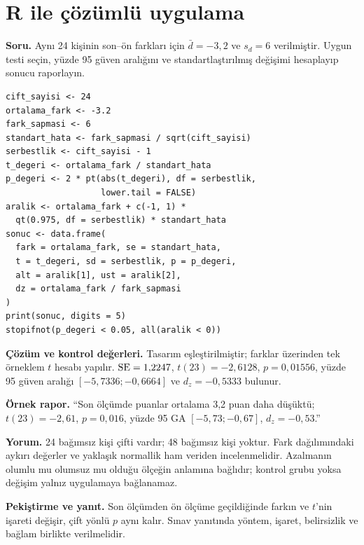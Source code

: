 \section{R ile çözümlü uygulama}
\label{sec:r-b14}

\textbf{Soru.} Aynı 24 kişinin son--ön farkları için $\bar d=-3{,}2$ ve
$s_d=6$ verilmiştir. Uygun testi seçin, yüzde 95 güven aralığını ve
standartlaştırılmış değişimi hesaplayıp sonucu raporlayın.

\begin{lstlisting}[style=prismR]
cift_sayisi <- 24
ortalama_fark <- -3.2
fark_sapmasi <- 6
standart_hata <- fark_sapmasi / sqrt(cift_sayisi)
serbestlik <- cift_sayisi - 1
t_degeri <- ortalama_fark / standart_hata
p_degeri <- 2 * pt(abs(t_degeri), df = serbestlik,
                   lower.tail = FALSE)
aralik <- ortalama_fark + c(-1, 1) *
  qt(0.975, df = serbestlik) * standart_hata
sonuc <- data.frame(
  fark = ortalama_fark, se = standart_hata,
  t = t_degeri, sd = serbestlik, p = p_degeri,
  alt = aralik[1], ust = aralik[2],
  dz = ortalama_fark / fark_sapmasi
)
print(sonuc, digits = 5)
stopifnot(p_degeri < 0.05, all(aralik < 0))
\end{lstlisting}

\begin{outputguidebox}
\textbf{Çözüm ve kontrol değerleri.} Tasarım eşleştirilmiştir; farklar
üzerinden tek örneklem $t$ hesabı yapılır. $\operatorname{SE}=1{,}2247$,
$t(23)=-2{,}6128$, $p=0{,}01556$, yüzde 95 güven aralığı
$[-5{,}7336;-0{,}6664]$ ve $d_z=-0{,}5333$ bulunur.

\textbf{Örnek rapor.} ``Son ölçümde puanlar ortalama 3,2 puan daha düşüktü;
$t(23)=-2{,}61$, $p=0{,}016$, yüzde 95 GA $[-5{,}73;-0{,}67]$,
$d_z=-0{,}53$.''
\end{outputguidebox}

\textbf{Yorum.} 24 bağımsız kişi çifti vardır; 48 bağımsız kişi yoktur.
Fark dağılımındaki aykırı değerler ve yaklaşık normallik ham veriden
incelenmelidir. Azalmanın olumlu mu olumsuz mu olduğu ölçeğin anlamına bağlıdır;
kontrol grubu yoksa değişim yalnız uygulamaya bağlanamaz.

\textbf{Pekiştirme ve yanıt.} Son ölçümden ön ölçüme geçildiğinde farkın
ve $t$'nin işareti değişir, çift yönlü $p$ aynı kalır. Sınav yanıtında yöntem,
işaret, belirsizlik ve bağlam birlikte verilmelidir.